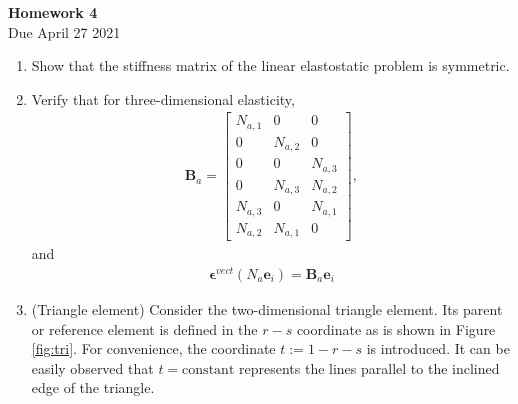 \documentclass[12pt]{article}
\begin{document}
\begin{center}
\textbf{\Large
Homework 4
}\\
\normalsize Due April 27 2021





\end{center}
\begin{enumerate}
\item Show that the stiffness matrix of the linear elastostatic problem is symmetric.

\item Verify that for three-dimensional elasticity,
\begin{align*}
\mathbf{B}_a = 
\begin{bmatrix}
N_{a,1} & 0 & 0 \\
0 & N_{a,2} & 0 \\
0 & 0 & N_{a,3} \\
0 & N_{a,3} & N_{a,2} \\
N_{a,3} & 0 & N_{a,1} \\
N_{a,2} & N_{a,1} & 0
\end{bmatrix},
\end{align*}
and
\begin{align*}
\bm \epsilon^{vect}(N_a \bm e_i) = \mathbf{B}_a \bm e_i
\end{align*}

\item (Triangle element) Consider the two-dimensional triangle element. Its parent or reference element is defined in the $r-s$ coordinate as is shown in Figure \ref{fig:tri}. For convenience, the coordinate $t := 1 - r - s$ is introduced. It can be easily observed that $t= \mathrm{constant}$ represents the lines parallel to the inclined edge of the triangle.


\end{enumerate}
\end{document}
